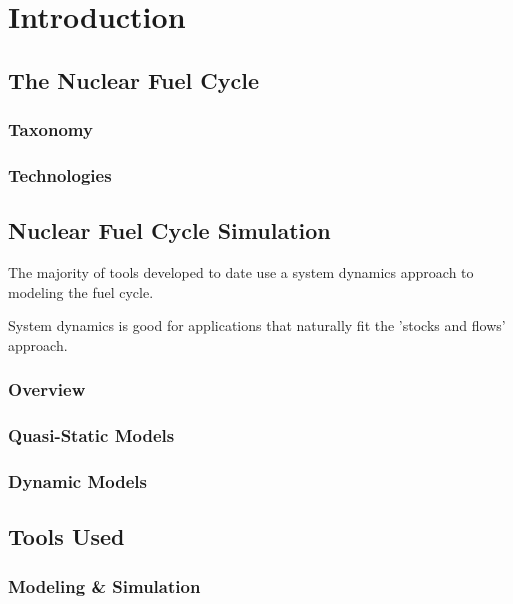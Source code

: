 \chapter{Introduction}\label{ch:intro}

\section{The Nuclear Fuel Cycle}

\subsection{Taxonomy}

\subsection{Technologies}

\section{Nuclear Fuel Cycle Simulation}\label{intro:fcs}

The majority of tools developed to date use a system dynamics approach to
modeling the fuel cycle.

System dynamics is good for applications that naturally fit the 'stocks and
flows' approach.

\subsection{Overview}

\subsection{Quasi-Static Models}

\subsection{Dynamic Models}

\section{Tools Used}

\subsection{Modeling \& Simulation}\label{intro:sim}

